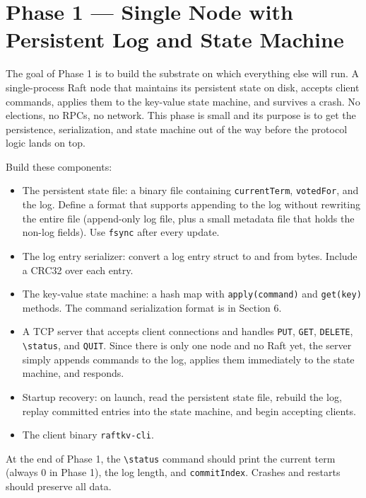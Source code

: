 \documentclass[11pt,a4paper]{article}
\begin{document}
\section{Phase 1 --- Single Node with Persistent Log and State Machine}

The goal of Phase 1 is to build the substrate on which everything else will run. A single-process Raft node that maintains its persistent state on disk, accepts client commands, applies them to the key-value state machine, and survives a crash. No elections, no RPCs, no network. This phase is small and its purpose is to get the persistence, serialization, and state machine out of the way before the protocol logic lands on top.

Build these components:

\begin{itemize}
\item The persistent state file: a binary file containing \texttt{currentTerm}, \texttt{votedFor}, and the log. Define a format that supports appending to the log without rewriting the entire file (append-only log file, plus a small metadata file that holds the non-log fields). Use \texttt{fsync} after every update.

\item The log entry serializer: convert a log entry struct to and from bytes. Include a CRC32 over each entry.

\item The key-value state machine: a hash map with \texttt{apply(command)} and \texttt{get(key)} methods. The command serialization format is in Section 6.

\item A TCP server that accepts client connections and handles \texttt{PUT}, \texttt{GET}, \texttt{DELETE}, \verb|\status|, and \texttt{QUIT}. Since there is only one node and no Raft yet, the server simply appends commands to the log, applies them immediately to the state machine, and responds.

\item Startup recovery: on launch, read the persistent state file, rebuild the log, replay committed entries into the state machine, and begin accepting clients.

\item The client binary \texttt{raftkv-cli}.
\end{itemize}

At the end of Phase 1, the \verb|\status| command should print the current term (always 0 in Phase 1), the log length, and \texttt{commitIndex}. Crashes and restarts should preserve all data.
\end{document}

